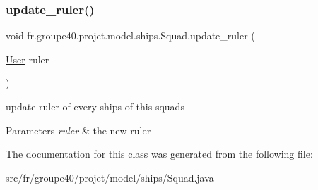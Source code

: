 \subsubsection{\texorpdfstring{update\+\_\+ruler()}{update\_ruler()}}
{\footnotesize\ttfamily void fr.\+groupe40.\+projet.\+model.\+ships.\+Squad.\+update\+\_\+ruler (\begin{DoxyParamCaption}\item[{\mbox{\hyperlink{classfr_1_1groupe40_1_1projet_1_1client_1_1_user}{User}}}]{ruler }\end{DoxyParamCaption})}



update ruler of every ships of this squads 


\begin{DoxyParams}{Parameters}
{\em ruler} & the new ruler \\
\hline
\end{DoxyParams}


The documentation for this class was generated from the following file\+:\begin{DoxyCompactItemize}
\item 
src/fr/groupe40/projet/model/ships/Squad.\+java\end{DoxyCompactItemize}
